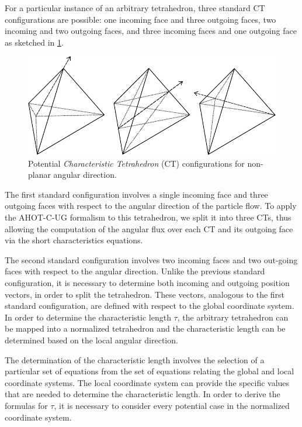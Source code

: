 For a particular instance of an arbitrary tetrahedron, three standard \ac{CT} configurations are possible: one incoming face and three outgoing faces, two incoming and two outgoing faces, and three incoming faces and one outgoing face as sketched in \ref{fig:non_planar_CTs}.

\begin{figure}[th]
  \includegraphics[width=1.0\textwidth]{chapters/theory/figures/CT_configurations.pdf}
  \caption{Potential \textit{Characteristic Tetrahedron} (\ac{CT}) configurations for non-planar angular direction.}
  \label{fig:non_planar_CTs}
\end{figure}

The first standard configuration involves a single incoming face and three outgoing faces with respect to the angular direction of the particle flow.
To apply the \ac{AHOT-C-UG} formalism to this tetrahedron, we split it into three \ac{CT}s, thus allowing the computation of the angular flux over each \ac{CT} and its outgoing face via the short characteristics equations.

The second standard configuration involves two incoming faces and two out-going faces with respect to the angular direction.
Unlike the previous standard configuration, it is necessary to determine both incoming and outgoing position vectors, in order to split the tetrahedron.
These vectors, analogous to the first standard configuration, are defined with respect to the global coordinate system.
In order to determine the characteristic length $\tau$, the arbitrary tetrahedron can be mapped into a normalized tetrahedron and the characteristic length can be determined based on the local angular direction.

The determination of the characteristic length involves the selection of a particular set of equations from the set of equations relating the global and local coordinate systems.
The local coordinate system can provide the specific values that are needed to determine the characteristic length.
In order to derive the formulas for $\tau$, it is necessary to consider every potential case in the normalized coordinate system.

